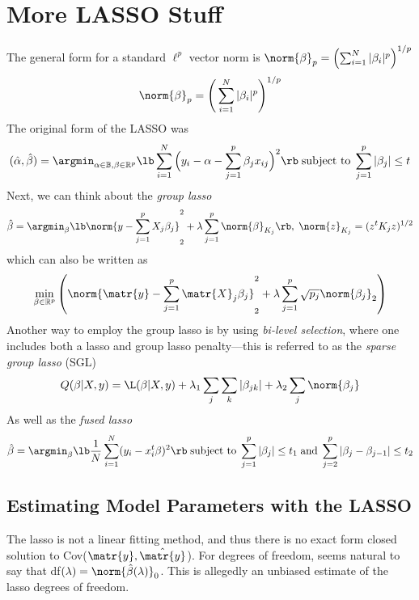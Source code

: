 \chapter{More LASSO Stuff}
\label{app:F}
The general form for a standard $\ell^p$ vector norm is $\norm{\beta}_p = \left(\sum_{i=1}^N|\beta_i|^p\right)^{1/p}$
\begin{equation}
    \norm{\beta}_p = \Bigg(\sum_{i=1}^N |\beta_i|^p\Bigg)^{1/p}
\end{equation}
The original form of the LASSO \cite{tibshirani1996regression} was
\begin{equation}
    (\hat{\alpha},\hat{\beta}) = \argmin_{\alpha \in \mathbb{B},\beta \in \mathbb{R}^p} \lb \sum_{i=1}^{N} \Big(y_i - \alpha - \sum_{j=1}^p \beta_j x_{ij} \Big)^2 \rb \; \text{subject to} \; \sum_{j=1}^p |\beta_j| \leq t
\end{equation}
Next, we can think about the \textit{group lasso} \cite{yuan2006model}
\begin{equation}
    \hat{\beta} = \argmin_{\beta} \lb \norm{y - \sum_{j=1}^p X_j \beta_j}_2^2 + \lambda\sum_{j=1}^p \norm{\beta}_{K_j} \rb , \; \norm{z}_{K_j} = (z^t K_j z)^{1/2}
\end{equation}
which can also be written as
\begin{equation}
    \min_{\beta \in \mathbb{R}^p} \left(\norm{\matr{y}-\sum_{j=1}^p \matr{X}_j\beta_j}_2^2 + \lambda\sum_{j=1}^p \sqrt{p_j}\norm{\beta_j}_2\right)
\end{equation}
Another way to employ the group lasso is by using \textit{bi-level selection}, where one includes both a lasso and group lasso penalty---this is referred to as the \textit{sparse group lasso} (SGL)
\begin{equation}
    Q(\beta|X,y) = \L (\beta|X,y) + \lambda_1 \sum_j \sum_k |\beta_{jk}| + \lambda_2 \sum_j \norm{\beta_j}
\end{equation}
As well as the \textit{fused lasso} \cite{tibshirani2005sparsity}
\begin{equation}
    \hat{\beta} = \argmin_{\beta} \lb\frac{1}{N}\sum_{i=1}^N (y_i - x_i^t\beta)^2 \rb \; \text{subject to} \; \sum_{j=1}^p |\beta_j| \leq t_1 \; \text{and} \; \sum_{j=2}^p |\beta_j - \beta_{j-1}| \leq t_2
\end{equation}

\section{Estimating Model Parameters with the LASSO}
The lasso is not a linear fitting method, and thus there is no exact form closed solution to Cov($\matr{y},\hat{\matr{y}}$). For degrees of freedom, seems natural to say that df$(\lambda) = \norm{\hat{\beta}(\lambda)}_0$. This is allegedly an unbiased estimate of the lasso degrees of freedom.


